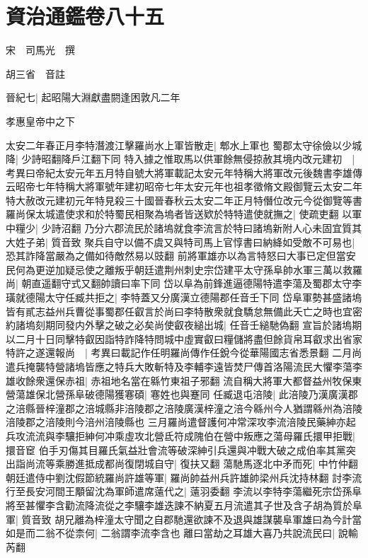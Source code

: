 \chapter{資治通鑑卷八十五}
宋　司馬光　撰

胡三省　音註

晉紀七|{
	起昭陽大淵獻盡閼逢困敦凡二年}


孝惠皇帝中之下

太安二年春正月李特潛渡江擊羅尚水上軍皆散走|{
	郫水上軍也}
蜀郡太守徐儉以少城降|{
	少詩昭翻降戶江翻下同}
特入據之惟取馬以供軍餘無侵掠赦其境内改元建初　|{
	考異曰帝紀太安元年五月特自號大將軍載記太安元年特稱大將軍改元後魏書李雄傳云昭帝七年特稱大將軍號年建初昭帝七年太安元年也祖孝徵脩文殿御覽云太安二年特大赦改元建初元年特見殺三十國晉春秋云太安二年正月特僭位改元今從御覽等書}
羅尚保太城遣使求和於特蜀民相聚為塢者皆送欵於特特遣使就撫之|{
	使疏吏翻}
以軍中糧少|{
	少詩沼翻}
乃分六郡流民於諸塢就食李流言於特曰諸塢新附人心未固宜質其大姓子弟|{
	質音致}
聚兵自守以備不虞又與特司馬上官惇書曰納絳如受敵不可易也|{
	恐其詐降當嚴為之備如待敵然易以豉翻}
前將軍雄亦以為言特怒曰大事已定但當安民何為更逆加疑忌使之離叛乎朝廷遣荆州刺史宗岱建平太守孫阜帥水軍三萬以救羅尚|{
	朝直遥翻守式又翻帥讀曰率下同}
岱以阜為前鋒進逼德陽特遣李蕩及蜀郡太守李璜就德陽太守任臧共拒之|{
	李特蓋又分廣漢立德陽郡任音壬下同}
岱阜軍勢甚盛諸塢皆有貳志益州兵曹從事蜀郡任叡言於尚曰李特散衆就食驕怠無備此夭亡之時也宜密約諸塢刻期同發内外擊之破之必矣尚使叡夜縋出城|{
	任音壬縋馳偽翻}
宣旨於諸塢期以二月十日同擊特叡因詣特詐降特問城中虛實叡曰糧儲將盡但餘貨帛耳叡求出省家特許之遂還報尚　|{
	考異曰載記作任明羅尚傳作任銳今從華陽國志省悉景翻}
二月尚遣兵掩襲特營諸塢皆應之特兵大敗斬特及李輔李遠皆焚尸傳首洛陽流民大懼李蕩李雄收餘衆還保赤祖|{
	赤祖地名當在緜竹東祖子邪翻}
流自稱大將軍大都督益州牧保東營蕩雄保北營孫阜破德陽獲寋碩|{
	寋姓也與蹇同}
任臧退屯涪陵|{
	此涪陵乃漢廣漢郡之涪縣晉梓潼郡之涪城縣非涪陵郡之涪陵廣漢梓潼之涪今緜州今人猶謂緜州為涪陵涪陵郡之涪陵則今涪州涪陵縣也}
三月羅尚遣督護何冲常深攻李流涪陵民藥紳亦起兵攻流流與李驤拒紳何冲乘虛攻北營氐符成隗伯在營中叛應之蕩母羅氏擐甲拒戰|{
	擐音䆠}
伯手刃傷其目羅氏氣益壯會流等破深紳引兵還與冲戰大破之成伯率其黨突出詣尚流等乘勝進抵成都尚復閉城自守|{
	復扶又翻}
蕩馳馬逐北中矛而死|{
	中竹仲翻}
朝廷遣侍中劉沈假節統羅尚許雄等軍|{
	羅尚帥益州兵許雄帥梁州兵沈持林翻}
討李流行至長安河間王顒留沈為軍師遣席薳代之|{
	薳羽委翻}
李流以李特李蕩繼死宗岱孫阜將至甚懼李含勸流降流從之李驤李雄迭諫不納夏五月流遣其子世及含子胡為質於阜軍|{
	質音致}
胡兄離為梓潼太守聞之自郡馳還欲諫不及退與雄謀襲阜軍雄曰為今計當如是而二翁不從柰何|{
	二翁謂李流李含也}
離曰當劫之耳雄大喜乃共說流民曰|{
	說輸芮翻}
